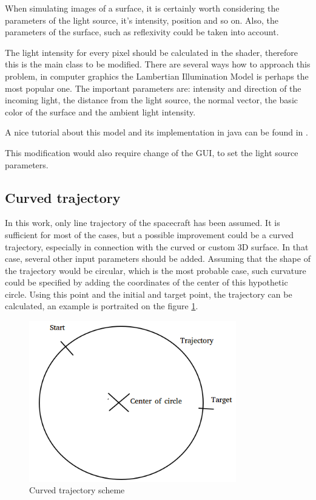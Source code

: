 \documentclass[english,12pt,a4paper,pdftex,elec,utf8]{aaltothesis}
\begin{document}
When simulating images of a surface, it is certainly worth considering the parameters of the light source, it's intensity, position and so on. Also, the parameters of the surface, such as reflexivity could be taken into account. 

The light intensity for every pixel should be calculated in the shader, therefore this is the main class to be modified. There are several ways how to approach this problem, in computer graphics the Lambertian Illumination Model is perhaps the most popular one. The important parameters are: intensity and direction of the incoming light, the distance from the light source, the normal vector, the basic color of the surface and the ambient light intensity.

A nice tutorial about this model and its implementation in java can be found in \cite{ShaderTut}.

This modification would also require change of the GUI, to set the light source parameters.

\subsection*{Curved trajectory}

In this work, only line trajectory of the spacecraft has been assumed. It is sufficient for most of the cases, but a possible improvement could be a curved trajectory, especially in connection with the curved or custom 3D surface. In that case, several other input parameters should be added. Assuming that the shape of the trajectory would be circular, which is the most probable case, such curvature could be specified by adding the coordinates of the center of this hypothetic circle. Using this point and the initial and target point, the trajectory can be calculated, an example is portraited on the figure \ref{CurvedTrajectory}.

\begin{figure}[htb]
\centering \includegraphics[height=7cm]{CurvedTrajectory.png}
\caption{Curved trajectory scheme\label{CurvedTrajectory}}
\end{figure}
\end{document}
